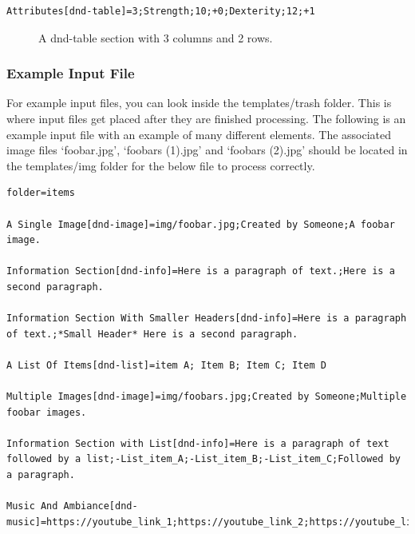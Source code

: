 \begin{lstlisting}
Attributes[dnd-table]=3;Strength;10;+0;Dexterity;12;+1
\end{lstlisting}

\begin{figure}[h]
	\centering
	\caption{A dnd-table section with 3 columns and 2 rows.}
	\label{fig:dnd-table-fig}
\end{figure}


\subsubsection{Example Input File}

For example input files, you can look inside the templates/trash folder. This is where input files get placed after they are finished processing. The following is an example input file with an example of many different elements. The associated image files `foobar.jpg', `foobars (1).jpg' and `foobars (2).jpg' should be located in the templates/img folder for the below file to process correctly.

\begin{lstlisting}
folder=items

A Single Image[dnd-image]=img/foobar.jpg;Created by Someone;A foobar image.

Information Section[dnd-info]=Here is a paragraph of text.;Here is a second paragraph.

Information Section With Smaller Headers[dnd-info]=Here is a paragraph of text.;*Small Header* Here is a second paragraph.

A List Of Items[dnd-list]=item A; Item B; Item C; Item D

Multiple Images[dnd-image]=img/foobars.jpg;Created by Someone;Multiple foobar images.

Information Section with List[dnd-info]=Here is a paragraph of text followed by a list;-List_item_A;-List_item_B;-List_item_C;Followed by a paragraph.

Music And Ambiance[dnd-music]=https://youtube_link_1;https://youtube_link_2;https://youtube_link_3
\end{lstlisting}


